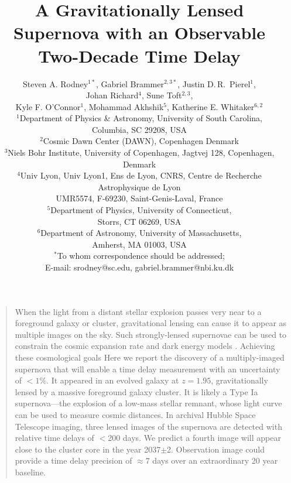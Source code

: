 \documentclass[12pt]{article}
\title{A Gravitationally Lensed Supernova with an Observable Two-Decade Time Delay}
\author{
 Steven A. Rodney$^{1\ast}$, 
 Gabriel Brammer$^{2,3\ast}$,  
 Justin D.\,R.~Pierel$^{1}$,\\ 
 Johan Richard$^{4}$, 
 Sune Toft$^{2,3}$,\\  
 Kyle F. O'Connor$^{1}$, 
 Mohammad Akhshik$^{5}$, 
 Katherine E. Whitaker$^{6,2}$  
\\

\normalsize{$^{1}$Department of Physics \& Astronomy, University of South Carolina,}\\ \normalsize{ Columbia, SC 29208, USA}\\
\normalsize{$^{2}$Cosmic Dawn Center (DAWN), Copenhagen Denmark}\\
\normalsize{$^{3}$Niels Bohr Institute, University of Copenhagen, Jagtvej 128, Copenhagen, Denmark}\\
\normalsize{$^{4}$Univ Lyon, Univ Lyon1, Ens de Lyon, CNRS, Centre de Recherche Astrophysique de Lyon}\\ \normalsize{UMR5574, F-69230, Saint-Genis-Laval, France}\\
\normalsize{$^{5}$Department of Physics, University of Connecticut,}\\ \normalsize{Storrs, CT 06269, USA}\\
\normalsize{$^{6}$Department of Astronomy, University of Massachusetts,}\\ \normalsize{Amherst, MA 01003, USA}\\
\normalsize{$^\ast$To whom correspondence should be addressed;}\\ \normalsize{E-mail:  srodney@sc.edu, gabriel.brammer@nbi.ku.dk}
}
\date{}
\newenvironment{sciabstract}{%
\begin{quote} \bf}
{\end{quote}}
\begin{document}
 


\baselineskip24pt


\maketitle 


\clearpage
\begin{sciabstract}


  When the light from a distant stellar explosion passes very near to a foreground galaxy or cluster, gravitational lensing can cause it to appear as multiple images on the sky.  Such strongly-lensed supernovae can be used to constrain the cosmic expansion rate \cite{refsdal_possibility_1964} and dark energy models \cite{treu_time_2016}.  Achieving these cosmological goals    Here we report the discovery of a multiply-imaged supernova that will enable a time delay measurement with an uncertainty of $<1\%$.  It appeared in an evolved galaxy at $z=1.95$, gravitationally lensed by a massive foreground galaxy cluster. It is likely a Type Ia supernova---the explosion of a low-mass stellar remnant, whose light curve can be used to measure cosmic distances.  In archival Hubble Space Telescope imaging, three lensed images of the supernova are detected with relative time delays of $<$200 days.  We predict a fourth image will appear close to the cluster core in the year 2037$\pm$2. 
  Observation  image could provide a time delay precision of $\approx 7$ days over an extraordinary 20 year baseline. 
  
  
  
\end{sciabstract}
\end{document}
